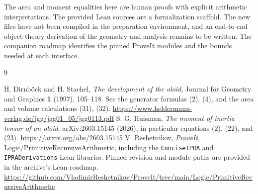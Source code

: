 \documentclass[11pt,letterpaper]{article}
\begin{document}
The area and moment equalities here are human proofs with explicit arithmetic interpretations. The provided Lean sources are a formalization scaffold. The new files have not been compiled in the preparation environment, and an end-to-end object-theory derivation of the geometry and analysis remains to be written. The companion roadmap identifies the pinned ProveIt modules and the bounds needed at each interface.

\begin{thebibliography}{9}\small\raggedright
{} H. Dirnböck and H. Stachel, \emph{The development of the oloid}, Journal for Geometry and Graphics \textbf{1} (1997), 105--118. See the generator formulas (2), (4), and the area and volume calculations (31), (32).
\url{https://www.heldermann-verlag.de/jgg/jgg01_05/jgg0113.pdf}
 S. G. Huisman, \emph{The moment of inertia tensor of an oloid}, arXiv:2603.15145 (2026), in particular equations (2), (22), and (23).
\url{https://arxiv.org/abs/2603.15145}
 V. Reshetnikov, \emph{ProveIt}, Logic/PrimitiveRecursiveArithmetic, including the \texttt{ConciseIPRA} and \texttt{IPRADerivations} Lean libraries. Pinned revision and module paths are provided in the archive's Lean roadmap.
\url{https://github.com/VladimirReshetnikov/ProveIt/tree/main/Logic/PrimitiveRecursiveArithmetic}
\end{thebibliography}
\end{document}
